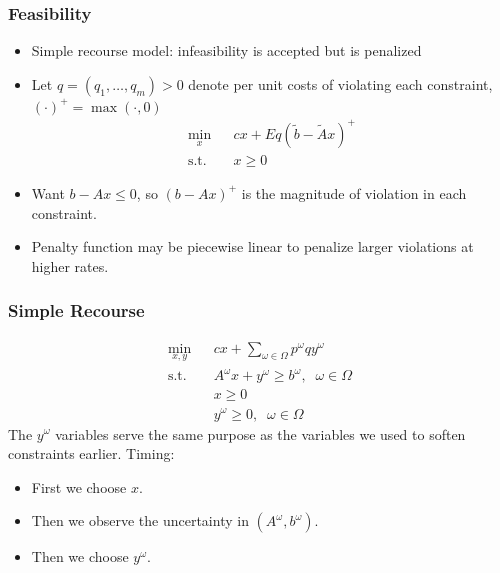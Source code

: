 \documentclass[12pt,handout]{beamer}
\begin{document}
\begin{frame}
\frametitle{Feasibility}
\begin{itemize}
\item Simple recourse model: infeasibility is accepted but is penalized
\item Let $q = (q_1, \ldots, q_m) > 0$ denote per unit costs of violating each constraint, $(\cdot)^+ = \max(\cdot, 0)$
\begin{eqnarray}
\min_x && cx + Eq(\tilde{b} - \tilde{A}x)^+ \nonumber \\
\mbox{s.t.} && x \ge 0 \nonumber
\end{eqnarray}
\item Want $b - Ax \le 0$, so $(b - Ax)^+$ is the magnitude of violation in each constraint.
\item Penalty function may be piecewise linear to penalize larger violations at higher rates.
\end{itemize}
\end{frame}

\begin{frame}
\frametitle{Simple Recourse}
\begin{eqnarray}
\min_{x, y} && c x + \sum_{\omega \in \Omega} p^\omega q y^\omega \nonumber \\
\mbox{s.t.} && A^\omega x + y^\omega \ge b^\omega,\;\;\omega \in \Omega \nonumber \\
&& x \ge 0 \nonumber \\
&& y^\omega \ge 0,\;\;\omega \in \Omega \nonumber
\end{eqnarray}
The $y^\omega$ variables serve the same purpose as the variables we used to soften constraints earlier.
Timing:
\begin{itemize}
\item First we choose $x$.
\item Then we observe the uncertainty in $(A^\omega, b^\omega)$.
\item Then we choose $y^\omega$.
\end{itemize}
\end{frame}
\end{document}
